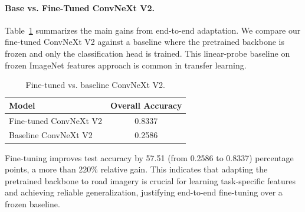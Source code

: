 \paragraph{Base vs. Fine-Tuned ConvNeXt V2.} Table~\ref{tab:rq_perf} summarizes the main gains from end-to-end adaptation. We compare our fine-tuned ConvNeXt V2 against a baseline where the pretrained backbone is frozen and only the classification head is trained. This linear-probe baseline on frozen ImageNet features approach is common in transfer learning.

\begin{table}[h!]
\centering
\caption{Fine-tuned vs. baseline ConvNeXt V2.}
\label{tab:rq_perf}
\begin{tabular}{lc}
    \toprule
    Model & Overall Accuracy \\
    \midrule
    Fine-tuned ConvNeXt V2 & 0.8337 \\
    Baseline ConvNeXt V2   & 0.2586 \\
    \bottomrule
\end{tabular}
\end{table}

Fine-tuning improves test accuracy by 57.51 (from 0.2586 to 0.8337) percentage points, a more than 220\% relative gain. This indicates that adapting the pretrained backbone to road imagery is crucial for learning task-specific features and achieving reliable generalization, justifying end-to-end fine-tuning over a frozen baseline.

